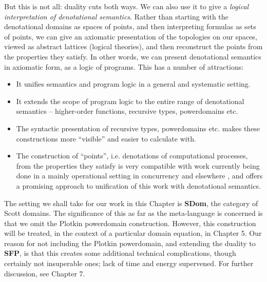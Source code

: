 But this is not all: duality cuts both ways.
We can also use it to give a {\em logical interpretation of
denotational semantics}.
Rather than starting with the denotational domains as spaces of points,
and then interpreting formulas as sets of points, we can give an
axiomatic presentation of the topologies on our spaces,
viewed as abstract lattices (logical theories), and then reconstruct
the points from the properties they satisfy.
In other words, we can present denotational semantics in axiomatic
form, as a logic of programs.
This has a number of attractions:
\begin{itemize}
\item It unifies semantics and program logic in a general and systematic
setting.
\item It extends the scope of program logic to the entire range of
denotational semantics -- higher-order functions, recursive types,
powerdomains etc.
\item The syntactic presentation of recursive types, powerdomains etc.
makes these constructions more ``visible'' and easier to calculate with. 
\item The construction of ``points'', i.e. denotations of computational
processes, from the properties they satisfy is very compatible
with work currently being done in a mainly operational setting in
concurrency \cite {HM85,Win80} and elsewhere \cite{BC85}, and offers
a promising approach to unification of this work with denotational semantics.
\end{itemize}

The setting we shall take for our work in this Chapter is {\bf SDom}, the category of Scott domains.
The significance of this as far as the meta-language is concerned is that 
we omit
the Plotkin powerdomain construction.
However, this construction will be treated, in the context of a particular domain equation,
in Chapter 5.
Our reason for not including the Plotkin powerdomain, and extending the duality
to {\bf SFP}, is that this creates some additional technical complications,
though certainly not insuperable ones; lack of time and energy supervened.
For further discussion, see Chapter 7.

